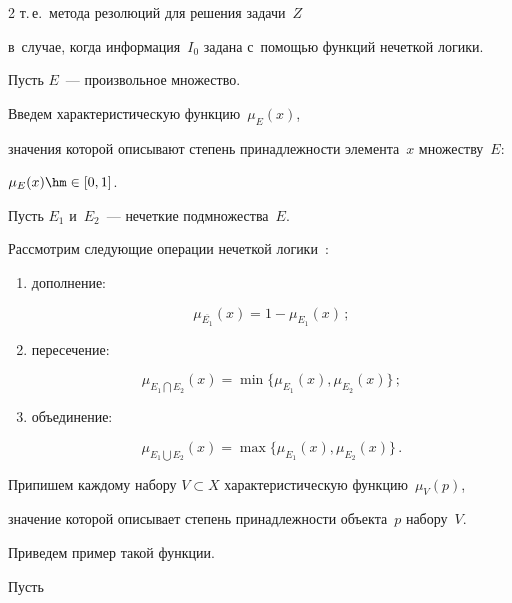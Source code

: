 \begin{multicols}{2}
 т.\,е.\ метода резолюций для решения задачи~$Z$ 


 в~случае, когда информация~$I_{0}$ задана с~помощью функций нечеткой логики.





Пусть $E $~--- произвольное множество.


Введем характеристическую функцию~$\mu_{E}(x) $,


 значения которой описывают степень принадлежности элемента~$x$ множеству~$E$: 


 $\mu_{E}(x) \hm\in [0,1]$.





Пусть $ E_{1}$ и~$ E_{2} $~--- нечеткие подмножества~$E$.


Рассмотрим следующие операции нечеткой логики~\cite{kofman}:


\begin{enumerate}[(1)]


\item дополнение:


$$


\mu_{\overline{E_{1}}} (x)= 1 - \mu_{E_{1}}(x)\,;


$$





\item пересечение:


$$


 \mu_{E_{1} \bigcap E_{2}}(x) = \min\{{\mu_{E_{1}}(x), \mu_{E_{2}}(x)}\}\,;


 $$ 


    


\item объединение:


$$ \mu_{E_{1} \bigcup E_{2}}(x) = \max\{{\mu_{E_{1}}(x), \mu_{E_{2}}(x)}\}\,.


$$


\end{enumerate}





Припишем каждому набору $V \subset X$ характеристическую функцию~$\mu_{V}(p)$, 


значение которой описывает степень принадлежности объекта~$p$ набору~$V$.


Приведем пример такой функции.


Пусть\linebreak



\end{multicols}
